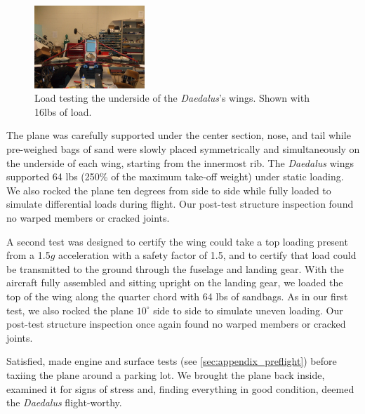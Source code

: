\documentclass[10pt,twocolumns]{report}
\newcommand{\degrees}[1]
{
\begin{math}
#1^{\circ} 
\end{math}
}
\begin{document}
 \begin{figure}
	\includegraphics[width=0.37\textwidth]{../images/daedalus_sandbagtest.jpg}
	\caption{Load testing the underside of the \emph{Daedalus}'s wings. Shown with 16lbs of load.}
	\label{fig:sandbagtest}
\end{figure}
The plane was carefully supported under the center section, nose, and tail while pre-weighed bags of sand were slowly placed symmetrically and simultaneously on the underside of each wing, starting from the innermost rib.  The \emph{Daedalus} wings supported 64 lbs (250\% of the maximum take-off weight) under static loading.  We also rocked the plane ten degrees from side to side while fully loaded to simulate differential loads during flight. Our post-test structure inspection found no warped members or cracked joints.

A second test was designed to certify the wing could take a top loading present from a 1.5$g$ acceleration with a safety factor of 1.5, and to certify that load could be transmitted to the ground through the fuselage and landing gear. With the aircraft fully assembled and sitting upright on the landing gear, we loaded the top of the wing along the quarter chord with 64 lbs of sandbags. As in our first test, we also rocked the plane \degrees{10} side to side to simulate uneven loading. Our post-test structure inspection once again found no warped members or cracked joints.

Satisfied, made engine and surface tests (see \ref{sec:appendix_preflight}) before taxiing the plane around a parking lot.  We brought the plane back inside, examined it for signs of stress and, finding everything in good condition, deemed the \emph{Daedalus} flight-worthy.
\end{document}
